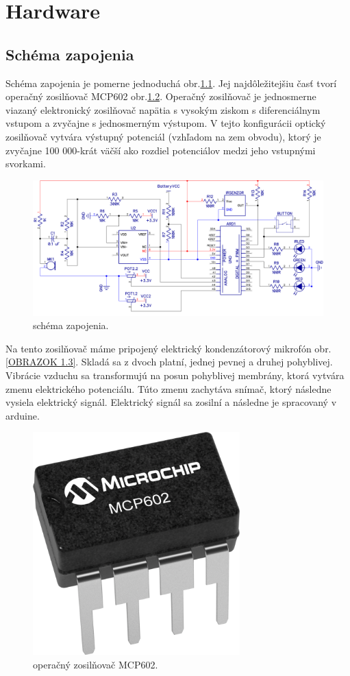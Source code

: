\chapter{Hardware}
\section{Schéma zapojenia}
Schéma zapojenia je pomerne jednoduchá obr.\ref{OBRAZOK 1.1}. Jej najdôležitejšiu časť tvorí operačný zosilňovač MCP602 obr.\ref{OBRAZOK 1.2}. Operačný zosilňovač je jednosmerne viazaný elektronický zosilňovač napätia s vysokým ziskom s diferenciálnym vstupom a zvyčajne s jednosmerným výstupom. V tejto konfigurácii optický zosilňovač vytvára výstupný potenciál (vzhľadom na zem obvodu), ktorý je zvyčajne 100 000-krát väčší ako rozdiel potenciálov medzi jeho vstupnými svorkami.

\begin{figure}[!tbh]
\centering
\includegraphics[width=\textwidth]{obr/schema.png}
\caption{schéma zapojenia.}\label{OBRAZOK 1.1}
\end{figure}

Na tento zosilňovač máme pripojený elektrický kondenzátorový mikrofón obr.\ref{OBRAZOK 1.3}. Skladá sa z dvoch platní, jednej pevnej a druhej pohyblivej. Vibrácie vzduchu sa transformujú na posun pohyblivej membrány, ktorá vytvára zmenu elektrického potenciálu. Túto zmenu zachytáva  snímač, ktorý následne vysiela elektrický signál. Elektrický signál sa zosilní a následne je spracovaný v arduine.

\begin{figure}[!tbh]
\centering
\includegraphics[width=8cm]{obr/mcp.png}
\caption{{operačný zosilňovač MCP602.\cite{mcp}}}\label{OBRAZOK 1.2}
\end{figure}

